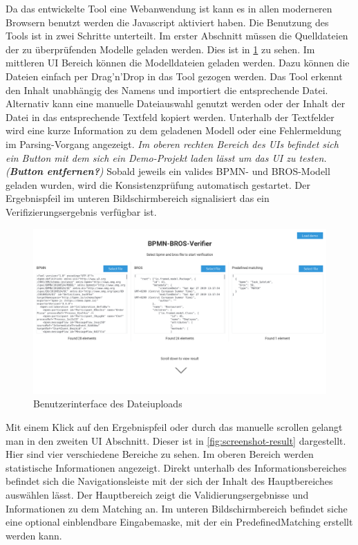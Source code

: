 Da das entwickelte Tool eine Webanwendung ist kann es in allen moderneren Browsern benutzt werden die Javascript aktiviert haben.
Die Benutzung des Tools ist in zwei Schritte unterteilt.
Im erster Abschnitt müssen die Quelldateien der zu überprüfenden Modelle geladen werden.
Dies ist in \cref{fig:screenshot-upload} zu sehen.
Im mittleren UI Bereich können die Modelldateien geladen werden.
Dazu können die Dateien einfach per Drag'n'Drop in das Tool gezogen werden.
Das Tool erkennt den Inhalt unabhängig des Namens und importiert die entsprechende Datei.
Alternativ kann eine manuelle Dateiauswahl genutzt werden oder der Inhalt der Datei in das entsprechende Textfeld kopiert werden.
Unterhalb der Textfelder wird eine kurze Information zu dem geladenen Modell oder eine Fehlermeldung im Parsing-Vorgang angezeigt.
\textit{Im oberen rechten Bereich des UIs befindet sich ein Button mit dem sich ein Demo-Projekt laden lässt um das UI zu testen. (\textbf{Button entfernen?})}
Sobald jeweils ein valides BPMN- und BROS-Modell geladen wurden, wird die Konsistenzprüfung automatisch gestartet.
Der Ergebnispfeil im unteren Bildschirmbereich signalisiert das ein Verifizierungsergebnis verfügbar ist.


\begin{figure}
    \centering
    \includegraphics[width=\textwidth,keepaspectratio]{../images/Screenshot-Upload.png}%
    \caption{Benutzerinterface des Dateiuploads}%
    \label{fig:screenshot-upload}
\end{figure}

Mit einem Klick auf den Ergebnispfeil oder durch das manuelle scrollen gelangt man in den zweiten UI Abschnitt.
Dieser ist in \cref{fig:screenshot-result} dargestellt.
Hier sind vier verschiedene Bereiche zu sehen.
Im oberen Bereich werden statistische Informationen angezeigt.
Direkt unterhalb des Informationsbereiches befindet sich die Navigationsleiste mit der sich der Inhalt des Hauptbereiches auswählen lässt.
Der Hauptbereich zeigt die Validierungsergebnisse und Informationen zu dem Matching an.
Im unteren Bildschirmbereich befindet siche eine optional einblendbare Eingabemaske, mit der ein PredefinedMatching erstellt werden kann.

